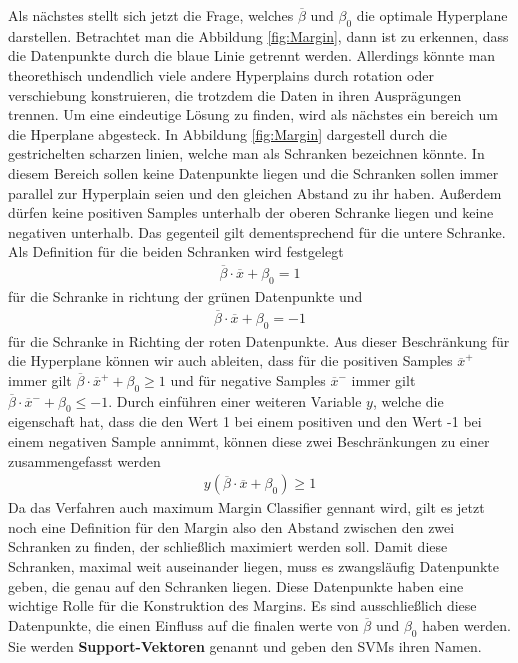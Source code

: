 \documentclass[
]{article}
\begin{document}
Als nächstes stellt sich jetzt die Frage, welches \(\overline{\beta}\)
und \(\beta_0\) die optimale Hyperplane darstellen. Betrachtet man die
Abbildung \ref{fig:Margin}, dann ist zu erkennen, dass die Datenpunkte
durch die blaue Linie getrennt werden. Allerdings könnte man
theorethisch undendlich viele andere Hyperplains durch rotation oder
verschiebung konstruieren, die trotzdem die Daten in ihren Ausprägungen
trennen. Um eine eindeutige Lösung zu finden, wird als nächstes ein
bereich um die Hperplane abgesteck. In Abbildung \ref{fig:Margin}
dargestell durch die gestrichelten scharzen linien, welche man als
Schranken bezeichnen könnte. In diesem Bereich sollen keine Datenpunkte
liegen und die Schranken sollen immer parallel zur Hyperplain seien und
den gleichen Abstand zu ihr haben. Außerdem dürfen keine positiven
Samples unterhalb der oberen Schranke liegen und keine negativen
unterhalb. Das gegenteil gilt dementsprechend für die untere Schranke.
Als Definition für die beiden Schranken wird festgelegt \begin{align}
\overline{\beta}\cdot \overline{x}+\beta_0=1\label{eq:posSV}
\end{align} für die Schranke in richtung der grünen Datenpunkte und
\begin{align}
\overline{\beta}\cdot \overline{x}+\beta_0=-1\label{eq:negSV}
\end{align} für die Schranke in Richting der roten Datenpunkte. Aus
dieser Beschränkung für die Hyperplane können wir auch ableiten, dass
für die positiven Samples \(\overline{x}^+\) immer gilt
\(\overline{\beta}\cdot \overline{x}^++\beta_0\ge 1\) und für negative
Samples \(\overline{x}^-\) immer gilt
\(\overline{\beta}\cdot \overline{x}^-+\beta_0\le -1\). Durch einführen
einer weiteren Variable \(y\), welche die eigenschaft hat, dass die den
Wert 1 bei einem positiven und den Wert -1 bei einem negativen Sample
annimmt, können diese zwei Beschränkungen zu einer zusammengefasst
werden \begin{align}
y(\overline{\beta}\cdot \overline{x}+\beta_0)\ge 1\label{eq:Nebenbedingung}
\end{align} Da das Verfahren auch maximum Margin Classifier gennant
wird, gilt es jetzt noch eine Definition für den Margin also den Abstand
zwischen den zwei Schranken zu finden, der schließlich maximiert werden
soll. Damit diese Schranken, maximal weit auseinander liegen, muss es
zwangsläufig Datenpunkte geben, die genau auf den Schranken liegen.
Diese Datenpunkte haben eine wichtige Rolle für die Konstruktion des
Margins. Es sind ausschließlich diese Datenpunkte, die einen Einfluss
auf die finalen werte von \(\overline{\beta}\) und \(\beta_0\) haben
werden. Sie werden \textbf{Support-Vektoren} genannt und geben den SVMs
ihren Namen.
\end{document}
